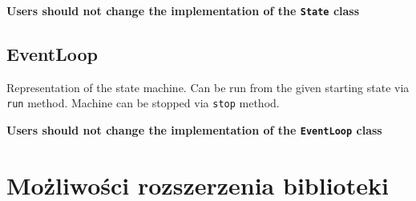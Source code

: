 \documentclass{article}
\begin{document}
\textbf{Users should not change the implementation of the \texttt{State}
class}

\subsection*{EventLoop}\label{eventloop}

Representation of the state machine. Can be run from the given starting
state via \texttt{run} method. Machine can be stopped via \texttt{stop}
method.

\textbf{Users should not change the implementation of the
\texttt{EventLoop} class}

\section{Możliwości rozszerzenia biblioteki}
\end{document}
